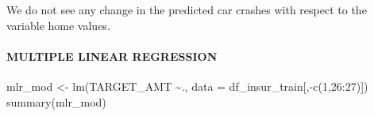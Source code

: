 \documentclass[
]{article}
\newenvironment{Shaded}{\begin{snugshade}}{\end{snugshade}}
\newcommand{\AttributeTok}[1]{\textcolor[rgb]{0.77,0.63,0.00}{#1}}
\newcommand{\DecValTok}[1]{\textcolor[rgb]{0.00,0.00,0.81}{#1}}
\newcommand{\FunctionTok}[1]{\textcolor[rgb]{0.00,0.00,0.00}{#1}}
\newcommand{\NormalTok}[1]{#1}
\newcommand{\OtherTok}[1]{\textcolor[rgb]{0.56,0.35,0.01}{#1}}
\newcommand{\SpecialCharTok}[1]{\textcolor[rgb]{0.00,0.00,0.00}{#1}}
\begin{document}
We do not see any change in the predicted car crashes with respect to
the variable home values.

\hypertarget{multiple-linear-regression}{%
\paragraph{MULTIPLE LINEAR
REGRESSION}\label{multiple-linear-regression}}

\begin{Shaded}
\begin{Highlighting}[]
\NormalTok{mlr\_mod }\OtherTok{\textless{}{-}} \FunctionTok{lm}\NormalTok{(TARGET\_AMT }\SpecialCharTok{\textasciitilde{}}\NormalTok{., }\AttributeTok{data =}\NormalTok{ df\_insur\_train[,}\SpecialCharTok{{-}}\FunctionTok{c}\NormalTok{(}\DecValTok{1}\NormalTok{,}\DecValTok{26}\SpecialCharTok{:}\DecValTok{27}\NormalTok{)])}
\FunctionTok{summary}\NormalTok{(mlr\_mod)}
\end{Highlighting}
\end{Shaded}
\end{document}
